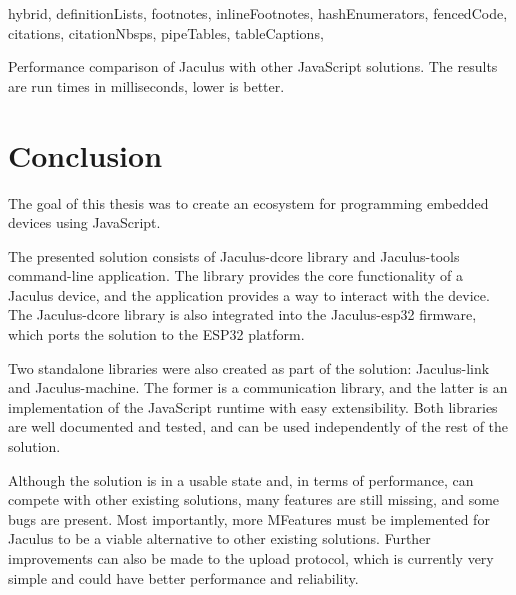 \begin{markdown*}{%
  hybrid,
  definitionLists,
  footnotes,
  inlineFootnotes,
  hashEnumerators,
  fencedCode,
  citations,
  citationNbsps,
  pipeTables,
  tableCaptions,
}
\begin{table}[ht]
  \caption[Performance comparison of Jaculus with other JavaScript solutions]{Performance comparison of Jaculus with other JavaScript solutions. The results are run times in milliseconds, lower is better.}

  \label{tab:performance}
\end{table}


\chapter{Conclusion}

The goal of this thesis was to create an ecosystem for programming embedded devices using JavaScript.

The presented solution consists of Jaculus-dcore library and Jaculus-tools command-line application. The library provides the core functionality of a Jaculus device, and the application provides a way to interact with the device. The Jaculus-dcore library is also integrated into the Jaculus-esp32 firmware, which ports the solution to the ESP32 platform.

Two standalone libraries were also created as part of the solution: Jaculus-link and Jaculus-machine. The former is a communication library, and the latter is an implementation of the JavaScript runtime with easy extensibility. Both libraries are well documented and tested, and can be used independently of the rest of the solution.

Although the solution is in a usable state and, in terms of performance, can compete with other existing solutions, many features are still missing, and some bugs are present. Most importantly, more MFeatures must be implemented for Jaculus to be a viable alternative to other existing solutions. Further improvements can also be made to the upload protocol, which is currently very simple and could have better performance and reliability.

\end{markdown*}
